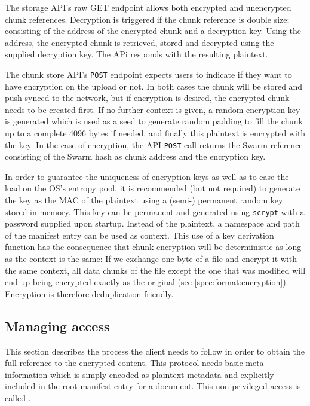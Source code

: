 
The storage API's raw GET endpoint allows both encrypted and unencrypted chunk references. 
Decryption is triggered if the chunk reference is double size; consisting of the address of the encrypted chunk and a decryption key. Using the address, the encrypted chunk is retrieved, stored and decrypted using the supplied decryption key. The APi responds with the resulting plaintext.

The chunk store API's \lstinline{POST} endpoint expects users to indicate if they want to have encryption on the upload or not. In both cases the chunk will be stored and push-synced to the network, but if encryption is desired, the encrypted chunk needs to be created first. If no further context is given, a random encryption key is generated which is used as a seed to generate random padding to fill the chunk up to a complete 4096 bytes if needed, and finally this plaintext is encrypted with the key. In the case of encryption, the API \lstinline{POST} call returns the Swarm reference consisting of the Swarm hash as chunk address and the encryption key. 

In order to guarantee the uniqueness of encryption keys as well as to ease the load on the OS's entropy pool, it is recommended (but not required) to generate the key as the MAC of the plaintext using a (semi-) permanent random key stored in memory. 
This key can be permanent and generated using \lstinline{scrypt} \cite{percival2009stronger}
with a password supplied upon startup. Instead of the plaintext, a namespace and path of the manifest entry can be used as context.
This use of a key derivation function has the consequence that chunk encryption will be deterministic as long as the context is the same: If we exchange one byte of a file and encrypt it with the same context, all data chunks of the file except the one that was modified will end up being encrypted exactly as the original (see \ref{spec:format:encryption}). Encryption is therefore deduplication friendly. 


\subsection{Managing access\statusgreen}\label{sec:managing-access}

This section describes the process the client needs to follow in order to obtain the full reference to the encrypted content. This protocol needs basic meta-information which is simply encoded as plaintext metadata and explicitly included in the root manifest entry for a document. This non-privileged access is called .

